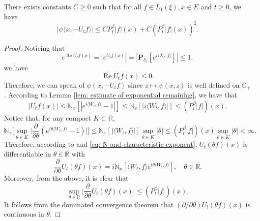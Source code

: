 \begin{lem}
    There exists constants $C\geq 0$ such that for all $f \in L_1(\xi),x\in E$ and $t\geq 0$, we have
\begin{equation}
\label{eq: upper bound of psi(v)}
    \big|\psi\big(x,-U_tf\big)\big|
    \leq C P^{\beta}_t |f|(x)+
         C (P^{\beta}_t |f| (x))^2.
\end{equation}
\end{lem}
\begin{proof}
     Noticing that
\[
    e^{\operatorname{Re} U_tf(x)}
    = |e^{U_tf(x)}|
    = |\mathbf P_{\delta_x}[e^{i \langle X_t, f\rangle}]|
    \leq 1,
\]
    we have
\begin{equation}
\label{eq: -v has positive real part}
 \operatorname{Re} U_tf(x)
    \leq 0.
\end{equation}
    Therefore, we can speak of $\psi(x,-U_tf)$ since $z\mapsto \psi(x,z)$ is well defined on $\mathbb C_+$.
    According to Lemma \ref{lem: estimate of exponential remaining}, we have that
\begin{equation}
\label{eq: upper bound for vf}
    |U_tf(x)| \leq \mathbb N_x[|e^{i \langle W_t, f\rangle} - 1|]
    \leq \mathbb N_x[|i \langle W_t, f\rangle|]
    \leq (P^{\beta}_t |f|)(x).
\end{equation}
    Notice that, for any compact $K \subset \mathbb R$,
\begin{equation}
\label{eq: estimate of deriavetive of v(theta)}
    \mathbb N_x\Big[\sup_{\theta \in K} \Big|\frac{\partial}{\partial \theta} (e^{i\theta \langle W_t, f\rangle} - 1) \Big|\Big]
    \leq \mathbb N_x[|\langle W_t, f\rangle|] \sup_{\theta \in K}|\theta|
    \leq (P^{\beta}_t |f|)(x) \sup_{\theta \in K}|\theta| < \infty.
\end{equation}
    Therefore, according to \cite[Theorem A.5.2]{Durrett2010Probability} and \eqref{eq: N and characteristic exponent},
    $U_t(\theta f)(x)$ is differentiable in $\theta \in \mathbb R$ with
\[
    \frac{\partial}{\partial \theta} U_t(\theta f)(x)
    = i\mathbb N_x[\langle W_t, f\rangle e^{i\theta \langle W_t, f\rangle}],
    \quad \theta \in \mathbb R.
\]
    Moreover, from the above, it is clear that
\begin{equation}
\label{eq: upper bounded for derivative of v(theta)}
    \sup_{\theta \in \mathbb R}\Big| \frac{\partial}{\partial \theta}U_t(\theta f)(x)\Big|
    \leq ( P^{\beta}_t |f|)(x).
\end{equation}
    It follows from the dominated convergence theorem that $(\partial/\partial \theta)U_t(\theta f)(x)$ is continuous in $\theta$.

\end{proof}
